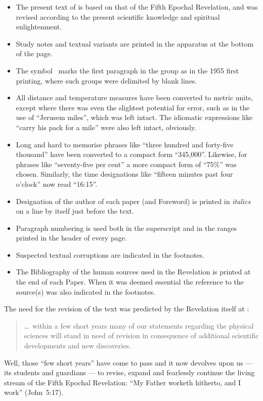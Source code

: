 \begin{itemize}
\item The present text of  is based on that of the Fifth Epochal Revelation,
and was revised according to the present scientific knowledge and spiritual enlightenment.
\item Study notes and textual variants are printed in the apparatus at the bottom of the page.
\item The symbol \pc\ marks the first paragraph in the group as in the 1955 first printing, where such groups were delimited by blank lines.
\item All distance and temperature measures have been converted to metric units, except where there was even the slightest potential for error, such as in the use of ``Jerusem miles'', which was left intact. The idiomatic expressions like ``carry his pack for a mile'' were also left intact, obviously.
\item Long and hard to memorise phrases like ``three hundred and forty\hyp{}five thousand'' have been converted to a compact form ``345,000''. Likewise, for phrases like ``seventy\hyp{}five per cent'' a more compact form of ``75\%'' was chosen. Similarly, the time designations like ``fifteen minutes past four o’clock'' now read ``16:15''.
\item Designation of the author of each paper (and Foreword) is printed in \textit{italics} on a line by itself just before the text.
\item Paragraph numbering is used both in the superscript and in the ranges printed in the head\-er of every page.
\item Suspected textual corruptions are indicated in the footnotes.
\item The Bibliography of the human sources used in the Revelation is printed at the end of each Paper.
      When it was deemed essential the reference to the source(s) was also indicated in the footnotes.
\end{itemize}

The need for the revision of the text was predicted by the Revelation itself at :
\begin{quote}
\ldots\ within a few short years many of our statements regarding the physical sciences will stand in need of revision in consequence of additional scientific developments and new discoveries.
\end{quote}
Well, those ``few short years'' have come to pass and it now devolves upon us --- its students and guardians --- to revise,
expand and fearlessly continue the living stream of the Fifth Epochal Revelation:
``My Father worketh hitherto, and I work'' (John~5:17).

